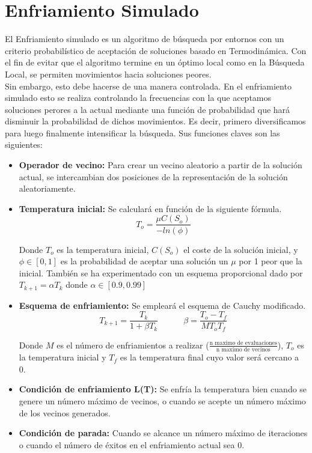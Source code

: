 \documentclass[a4paper, 12pt]{article}
\begin{document}
     	\newpage
     	\section{Enfriamiento Simulado}
     	El Enfriamiento simulado es un algoritmo de búsqueda por entornos con un criterio probabilístico de aceptación de soluciones basado en Termodinámica. Con el fin de evitar que el algoritmo termine en un óptimo local como en la Búsqueda Local, se permiten movimientos hacia soluciones peores.\\
     	
     	Sin embargo, esto debe hacerse de una manera controlada. En el enfriamiento simulado esto se realiza controlando la frecuencias con la que aceptamos soluciones perores a la actual mediante una función de probabilidad que hará disminuir la probabilidad de dichos movimientos. Es decir, primero diversificamos para luego finalmente intensificar la búsqueda. Sus funciones claves son las siguientes:
     	\begin{itemize}
     		\item \textbf{Operador de vecino:} Para crear un vecino aleatorio a partir de la solución actual, se intercambian dos posiciones de la representación de la solución aleatoriamente.
     		
     		\item \textbf{Temperatura inicial:} Se calculará en función de la siguiente fórmula.
     		$$T_{o} = \frac{\mu C(S_o)}{-ln(\phi)}$$
     		
     		Donde $T_o$ es la temperatura inicial, $C(S_o)$ el coste de la solución inicial, y $\phi \in [0,1]$ es la probabilidad de aceptar una solución un $\mu$ por 1 peor que la inicial. También se ha experimentado con un esquema proporcional dado por $T_{k+1} = \alpha T_k$ donde $\alpha \in [0.9, 0.99]$
     		
     		\item \textbf{Esquema de enfriamiento:} Se empleará el esquema de Cauchy modificado.
     		$$T_{k+1} = \frac{T_k}{1 + \beta T_k} \quad \quad \quad \beta = \frac{T_o - T_f}{MT_oT_f}$$
     		
     		Donde $M$ es el número de enfriamientos a realizar ($ \frac{\text{n maximo de evaluaciones}}{\text{n maximo de vecinos}}$), $T_o$ es la temperatura inicial y $T_f$ es la temperatura final cuyo valor será cercano a 0.
     		
     		\item \textbf{Condición de enfriamiento L(T):} Se enfría la temperatura bien cuando se genere un número máximo de vecinos, o cuando se acepte un número máximo de los vecinos generados.
     		
     		\item \textbf{Condición de parada:} Cuando se alcance un número máximo de iteraciones o cuando el número de éxitos en el enfriamiento actual sea 0.
     	\end{itemize}
     	
\end{document}
